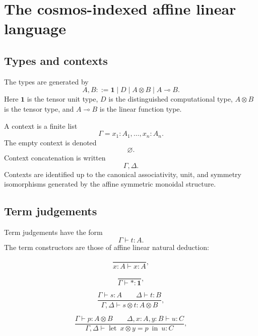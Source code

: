 \section{The cosmos-indexed affine linear language}
\label{sec:cosmos-indexed-affine-linear-language}

\subsection{Types and contexts}
\label{subsec:types-and-contexts-cosmos-indexed}

\begin{definition}[Types]
\label{def:affine-linear-types-cosmos}
The types are generated by
\[
    A,B ::= \mathbf 1 \mid D \mid A\otimes B \mid A\multimap B.
\]
Here \(\mathbf 1\) is the tensor unit type, \(D\) is the distinguished
computational type, \(A\otimes B\) is the tensor type, and
\(A\multimap B\) is the linear function type.
\end{definition}

\begin{definition}
\label{def:affine-linear-contexts-cosmos}
A context is a finite list
\[
    \Gamma=x_1:A_1,\dots,x_n:A_n.
\]
The empty context is denoted
\[
    \varnothing.
\]
Context concatenation is written
\[
    \Gamma,\Delta.
\]
Contexts are identified up to the canonical associativity, unit, and symmetry
isomorphisms generated by the affine symmetric monoidal structure.
\end{definition}

\subsection{Term judgements}
\label{subsec:term-judgements-cosmos-indexed}

Term judgements have the form
\[
    \Gamma\vdash t:A.
\]
The term constructors are those of affine linear natural deduction:

\[
    \frac{}
         {x:A\vdash x:A},
\]

\[
    \frac{}
         {\Gamma\vdash *:\mathbf 1},
\]

\[
    \frac{\Gamma\vdash s:A
          \qquad
          \Delta\vdash t:B}
         {\Gamma,\Delta\vdash s\otimes t:A\otimes B},
\]

\[
    \frac{\Gamma\vdash p:A\otimes B
          \qquad
          \Delta,x:A,y:B\vdash u:C}
         {\Gamma,\Delta\vdash
          \operatorname{let}\ x\otimes y=p\ \operatorname{in}\ u:C},
\]

